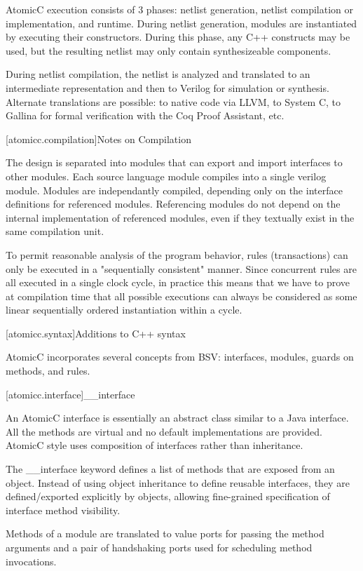 AtomicC execution consists of 3 phases: netlist generation, netlist
compilation or implementation, and runtime.  During netlist
generation, modules are instantiated by executing their
constructors. During this phase, any C++ constructs may be used, but
the resulting netlist may only contain synthesizeable components.

During netlist compilation, the netlist is analyzed and translated to
an intermediate representation and then to Verilog for simulation or
synthesis. Alternate translations are possible: to native code via
LLVM, to System C, to Gallina for formal verification with the Coq
Proof Assistant, etc.


[atomicc.compilation]{Notes on Compilation}

The design is separated into modules that can export and import interfaces to other modules.
Each source language module compiles into a single verilog module.  Modules are independantly
compiled, depending only on the interface definitions for referenced modules.
Referencing modules do not depend on the internal implementation of referenced modules,
even if they textually exist in the same compilation unit.

To permit reasonable analysis of the program behavior, rules (transactions) can only be
executed in a "sequentially consistent" manner.  Since concurrent rules are all executed in a
single clock cycle, in practice this means that we have to prove at compilation time that
all possible executions can always be considered as some linear sequentially ordered instantiation
within a cycle.

[atomicc.syntax]{Additions to C++ syntax}

AtomicC incorporates several concepts from BSV: interfaces, modules, guards on methods, and rules.

[atomicc.interface]{__interface}

An AtomicC interface is essentially an abstract class similar to a
Java interface. All the methods are virtual and no default
implementations are provided. AtomicC style uses composition of
interfaces rather than inheritance.

The __interface keyword defines a list of methods that are exposed from an object.
Instead of using object inheritance to define reusable interfaces,
they are defined/exported explicitly by objects, allowing fine-grained
specification of interface method visibility.

Methods of a module are translated to value ports for passing the
method arguments and a pair of handshaking ports used for scheduling
method invocations.

